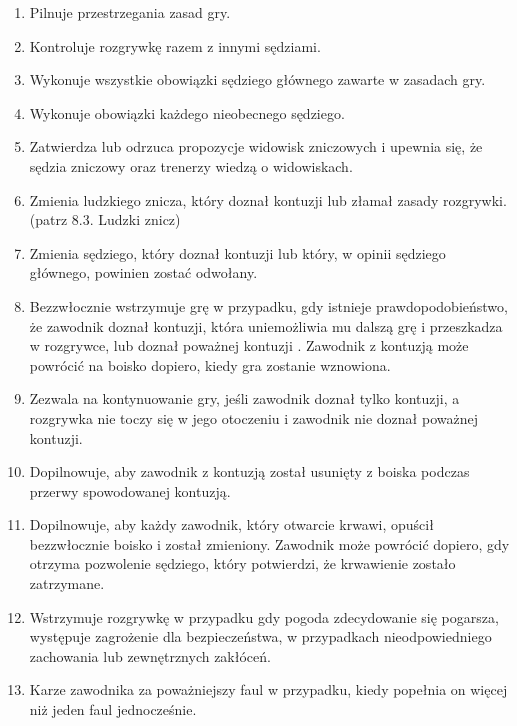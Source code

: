 \documentclass[12pt]{article}
\begin{document}
\begin{enumerate}
\item Pilnuje przestrzegania zasad gry.

\item Kontroluje rozgrywkę razem z innymi sędziami.

\item Wykonuje wszystkie obowiązki sędziego głównego zawarte w zasadach
gry.

\item Wykonuje obowiązki każdego nieobecnego sędziego.

\item Zatwierdza lub odrzuca propozycje widowisk zniczowych i upewnia się,
że sędzia zniczowy oraz trenerzy wiedzą o widowiskach.

\item Zmienia ludzkiego znicza, który doznał kontuzji lub złamał zasady
rozgrywki. (patrz 8.3. Ludzki znicz)

\item Zmienia sędziego, który doznał kontuzji lub który, w opinii sędziego
głównego, powinien zostać odwołany.

\item Bezzwłocznie wstrzymuje grę w przypadku, gdy istnieje
prawdopodobieństwo, że zawodnik doznał kontuzji, która uniemożliwia mu
dalszą grę i przeszkadza w rozgrywce, lub doznał poważnej kontuzji .
Zawodnik z kontuzją może powrócić na boisko dopiero, kiedy gra zostanie
wznowiona.

\item Zezwala na kontynuowanie gry, jeśli zawodnik doznał tylko kontuzji, a
rozgrywka nie toczy się w jego otoczeniu i zawodnik nie doznał poważnej
kontuzji.

\item Dopilnowuje, aby zawodnik z kontuzją został usunięty z boiska podczas
przerwy spowodowanej kontuzją.

\item Dopilnowuje, aby każdy zawodnik, który otwarcie krwawi, opuścił
bezzwłocznie boisko i został zmieniony. Zawodnik może powrócić dopiero,
gdy otrzyma pozwolenie sędziego, który potwierdzi, że krwawienie zostało
zatrzymane.

\item Wstrzymuje rozgrywkę w przypadku gdy pogoda zdecydowanie się
pogarsza, występuje zagrożenie dla bezpieczeństwa, w przypadkach
nieodpowiedniego zachowania lub zewnętrznych zakłóceń.

\item Karze zawodnika za poważniejszy faul w przypadku, kiedy popełnia on
więcej niż jeden faul jednocześnie.


\end{enumerate}
\end{document}
